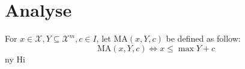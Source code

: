 \chapter{Analyse}

For $x\in \mathcal{X},Y\subseteq\mathcal{X}^m,c\in I$, let $\text{MA}(x,Y,c)$ be defined as follow:
$$
\text{MA}(x,Y,c)\iff x\le \max Y+c
$$
\gls{ny} Hi